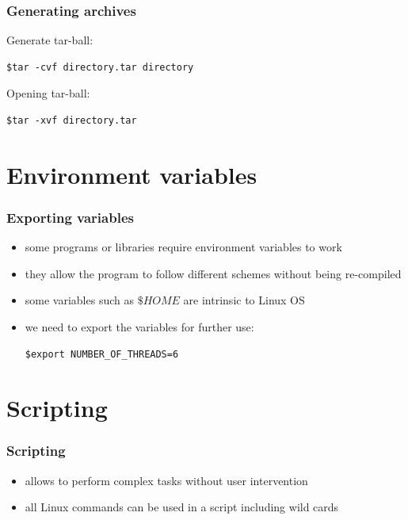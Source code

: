 
\begin{frame}[fragile]
	\frametitle{Generating archives}

Generate tar-ball:

\begin{verbatim}
$tar -cvf directory.tar directory 
\end{verbatim}

Opening tar-ball:

\begin{verbatim}
$tar -xvf directory.tar
\end{verbatim}

\end{frame}

\section{Environment variables}
\begin{frame}[fragile]
	\frametitle{Exporting variables}

\begin{itemize}
   \item some programs or libraries require environment variables to work
   \item they allow the program to follow different schemes without being re-compiled
   \item some variables such as $\$HOME$ are intrinsic to Linux OS
   \item we need to export the variables for further use:

\begin{verbatim}
$export NUMBER_OF_THREADS=6
\end{verbatim}
\end{itemize}

\end{frame}
\section{Scripting}

\begin{frame}
	\frametitle{Scripting}

\begin{itemize}
\item allows to perform complex tasks without user intervention
\item all Linux commands can be used in a script including wild cards

\end{itemize}

\end{frame}

